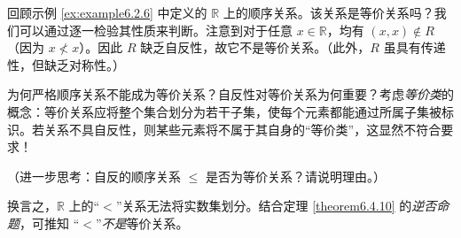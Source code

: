 \begin{example}
    回顾示例 \ref{ex:example6.2.6} 中定义的 $\mathbb{R}$ 上的顺序关系。该关系是等价关系吗？我们可以通过逐一检验其性质来判断。注意到对于任意 $x \in \mathbb{R}$，均有 $(x, x) \notin R$（因为 $x \nless x$）。因此 $R$ 缺乏自反性，故它不是等价关系。（此外，$R$ 虽具有传递性，但缺乏对称性。）

    为何严格顺序关系不能成为等价关系？自反性对等价关系为何重要？考虑\emph{等价类}的概念：等价关系应将整个集合划分为若干子集，使每个元素都能通过所属子集被标识。若关系不具自反性，则某些元素将不属于其自身的``等价类''，这显然不符合要求！

    （进一步思考：自反的顺序关系 $\le$ 是否为等价关系？请说明理由。）
    
    换言之，$\mathbb{R}$ 上的``$<$''关系无法将实数集划分。结合定理 \ref{theorem6.4.10} 的\emph{逆否命题}，可推知 ``$<$''\emph{不是}等价关系。
\end{example}

